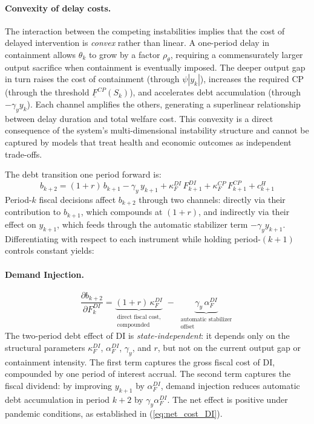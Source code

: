 \documentclass[12pt, a4paper]{article}
\begin{document}
\paragraph{Convexity of delay costs.} The interaction between the competing
instabilities implies that the cost of delayed intervention is \textit{convex} rather
than linear. A one-period delay in containment allows $\theta_k$ to grow by a factor
$\rho_\theta$, requiring a commensurately larger output sacrifice when containment is
eventually imposed. The deeper output gap in turn raises the cost of containment (through
$\psi |y_k|$), increases the required CP (through the threshold $\underline{F}^{CP}(S_k)$),
and accelerates debt accumulation (through $-\gamma_y y_k$). Each channel amplifies the
others, generating a superlinear relationship between delay duration and total welfare
cost. This convexity is a direct consequence of the system's multi-dimensional
instability structure and cannot be captured by models that treat health and economic
outcomes as independent trade-offs.


The debt transition one period forward is:
%
\begin{equation}
    b_{k+2} = (1+r) \, b_{k+1} - \gamma_y \, y_{k+1}
      + \kappa_F^{DI} \, F_{k+1}^{DI}
      + \kappa_F^{CP} \, F_{k+1}^{CP}
      + c_{k+1}^{H}
\end{equation}
%
Period-$k$ fiscal decisions affect $b_{k+2}$ through two channels: directly via
their contribution to $b_{k+1}$, which compounds at $(1+r)$, and indirectly via
their effect on $y_{k+1}$, which feeds through the automatic stabilizer term
$-\gamma_y y_{k+1}$. Differentiating with respect to each instrument while
holding period-$(k+1)$ controls constant yields:

\paragraph{Demand Injection.}
%
\begin{equation}
    \frac{\partial b_{k+2}}{\partial F_k^{DI}}
      = \underbrace{(1+r) \, \kappa_F^{DI}}_{\substack{\text{direct fiscal cost,} \\ \text{compounded}}}
      \;-\; \underbrace{\gamma_y \, \alpha_F^{DI}}_{\substack{\text{automatic stabilizer} \\ \text{offset}}}
    \label{eq:db2_dDI}
\end{equation}
%
The two-period debt effect of DI is \textit{state-independent}: it depends only
on the structural parameters $\kappa_F^{DI}$, $\alpha_F^{DI}$, $\gamma_y$, and
$r$, but not on the current output gap or containment intensity. The first term
captures the gross fiscal cost of DI, compounded by one period of interest
accrual. The second term captures the fiscal dividend: by improving $y_{k+1}$ by
$\alpha_F^{DI}$, demand injection reduces automatic debt accumulation in period
$k+2$ by $\gamma_y \alpha_F^{DI}$. The net effect is positive under pandemic
conditions, as established in (\ref{eq:net_cost_DI}).
\end{document}
